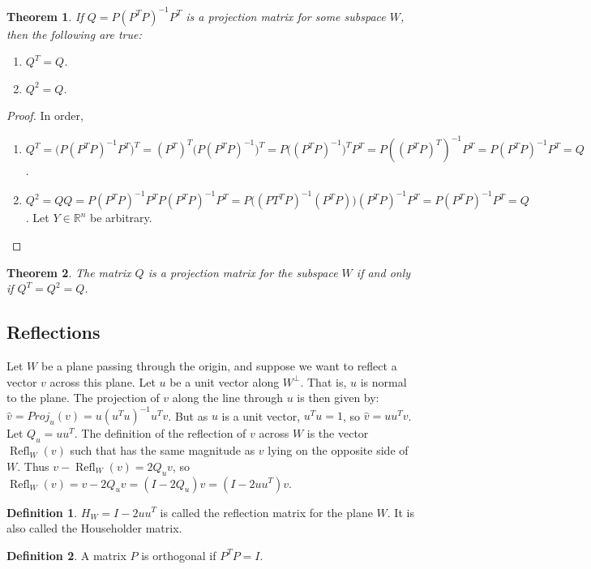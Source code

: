 \documentclass[oneside]{book}
\newtheorem{theorem}{Theorem}[section]
\theoremstyle{definition}
\newtheorem{definition}{Definition}[section]
\DeclareMathOperator{\Refl}{Refl}
\begin{document}
\begin{theorem}
If $Q = P(P^TP)^{-1}P^T$ is a projection matrix for some subspace $W$, then the following are true:
\begin{enumerate}
\item $Q^T =Q$.
\item $Q^2 = Q$.
\end{enumerate}
\end{theorem}
\begin{proof}
In order,
\begin{enumerate}
\item $Q^T = \big(P(P^TP)^{-1}P^T\big)^T = (P^T)^T\big(P(P^TP)^{-1}\big)^T = P \big((P^TP)^{-1}\big)^TP^T = P((P^TP)^T)^{-1}P^T = P(P^TP)^{-1}P^T=Q$.
\item $Q^2 = QQ = P(P^TP)^{-1}P^T P(P^TP)^{-1}P^T = P\big((PT^TP)^{-1}(P^TP)\big)(P^TP)^{-1}P^T = P(P^TP)^{-1}P^T = Q$. Let $Y\in \mathbb{R}^n$ be arbitrary. 
\end{enumerate}
\end{proof}

\begin{theorem}
The matrix $Q$ is a projection matrix for the subspace $W$ if and only if $Q^T=Q^2=Q$.
\end{theorem}

\subsection{Reflections}

Let $W$ be a plane passing through the origin, and suppose we want to reflect a vector $v$ across this plane. Let $u$ be a unit vector along $W^{\perp}$. That is, $u$ is normal to the plane. The projection of $v$ along the line through $u$ is then given by: $\hat{v} = Proj_{u}(v) = u(u^Tu)^{-1}u^Tv$. But as $u$ is a unit vector, $u^Tu = 1$, so $\hat{v} = uu^T v$. Let $Q_u = uu^T$. The definition of the reflection of $v$ across $W$ is the vector $\Refl_{W}(v)$ such that has the same magnitude as $v$ lying on the opposite side of $W$. Thus $v-\Refl_{W}(v) = 2Q_u v$, so $\Refl_{W}(v)= v-2Q_u v = (I-2Q_u)v =(I-2uu^T)v$. 

\begin{definition}
$H_W = I-2uu^T$ is called the reflection matrix for the plane $W$. It is also called the Householder matrix.
\end{definition}

\begin{definition}
A matrix $P$ is orthogonal if $P^TP = I$.
\end{definition}
\end{document}
